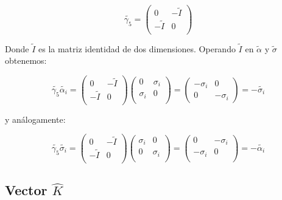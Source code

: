 \documentclass[a4paper, 12pt]{article} %
\begin{document}
\[
\widetilde{\gamma_5} = 
\begin{pmatrix} 
0 & - \widetilde{I} \\
-\widetilde{I} & 0 \\
\end{pmatrix}
\]

Donde $\widetilde{I}$ es la matriz identidad de dos dimensiones. Operando  $\widetilde{I}$ 
en $\widetilde{\alpha}$ y $\widetilde{\sigma}$ obtenemos:

\[
\widetilde{\gamma_5}\widetilde{\alpha_i} = 
\begin{pmatrix} 
0 & - \widetilde{I} \\
-\widetilde{I} & 0 \\
\end{pmatrix} 
\begin{pmatrix} 
0 & \sigma_i \\
\sigma_i & 0 \\
\end{pmatrix} 
= 
\begin{pmatrix}
-\sigma_i & 0 \\
0 & -\sigma_i
\end{pmatrix}
= -\widetilde{\sigma_i}
\]

y an\'alogamente:

\[
\widetilde{\gamma_5}\widetilde{\sigma_i} = 
\begin{pmatrix} 
0 & - \widetilde{I} \\
-\widetilde{I} & 0 \\
\end{pmatrix} 
\begin{pmatrix} 
\sigma_i & 0 \\
0 & \sigma_i  \\
\end{pmatrix} 
= 
\begin{pmatrix}
0 & -\sigma_i \\
-\sigma_i & 0 \\
\end{pmatrix}
= -\widetilde{\alpha_i}
\]

\subsection{Vector $\hat{K}$}\label{sec:k}






\end{document}

